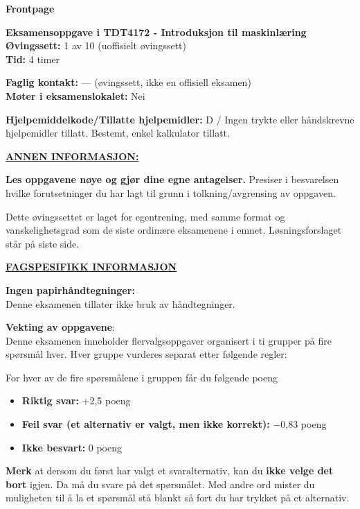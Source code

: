 \documentclass[11pt,a4paper]{article}
\begin{document}
\noindent\hspace*{-1.55em}%
{\sffamily\bfseries\fontsize{18}{22}\selectfont Frontpage}\par\vspace{1.1em}

{\bfseries Eksamensoppgave i TDT4172 - Introduksjon til maskinlæring}\\
{\bfseries Øvingssett:} 1 av 10 (uoffisielt øvingssett)\\
{\bfseries Tid:} 4 timer

\vspace{0.6em}
{\bfseries Faglig kontakt:} --- (øvingssett, ikke en offisiell eksamen)\\
{\bfseries Møter i eksamenslokalet:} Nei

\vspace{0.6em}
{\bfseries Hjelpemiddelkode/Tillatte hjelpemidler:} D / Ingen trykte eller håndskrevne hjelpemidler tillatt.
Bestemt, enkel kalkulator tillatt.

\vspace{0.6em}
{\bfseries\underline{ANNEN INFORMASJON:}}

\vspace{0.4em}
{\bfseries Les oppgavene nøye og gjør dine egne antagelser.} Presiser i besvarelsen hvilke forutsetninger du
har lagt til grunn i tolkning/avgrensing av oppgaven.

Dette øvingssettet er laget for egentrening, med samme format og vanskelighetsgrad som de
siste ordinære eksamenene i emnet. Løsningsforslaget står på siste side.

\vspace{1.6em}
{\bfseries\underline{FAGSPESIFIKK INFORMASJON}}

\vspace{0.4em}
{\bfseries Ingen papirhåndtegninger:}\\
Denne eksamenen tillater ikke bruk av håndtegninger.

\vspace{1.4em}
{\bfseries Vekting av oppgavene}:\\
Denne eksamenen inneholder flervalgsoppgaver organisert i ti grupper på fire spørsmål hver. Hver
gruppe vurderes separat etter følgende regler:

\vspace{0.6em}
For hver av de fire spørsmålene i gruppen får du følgende poeng
\begin{itemize}[leftmargin=2.2em,label=\textperiodcentered,itemsep=0pt]
\item {\bfseries Riktig svar:} +2,5 poeng
\item {\bfseries Feil svar (et alternativ er valgt, men ikke korrekt):} $-$0,83 poeng
\item {\bfseries Ikke besvart:} 0 poeng
\end{itemize}
{\bfseries Merk} at dersom du først har valgt et svaralternativ, kan du {\bfseries ikke velge det bort} igjen. Da må du
svare på det spørsmålet. Med andre ord mister du muligheten til å la et spørsmål stå blankt så fort
du har trykket på et alternativ.
\end{document}
